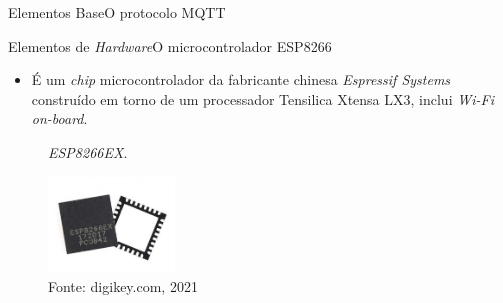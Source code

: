 \begin{frame}{Elementos Base}{O protocolo MQTT}
    \begin{table}[H]
        \centering
        \caption{Caracteres especiais utilizados para envio e recebimento no protocolo MQTT.}
        \label{tab:simbolos_mqtt}
    \end{table}

\end{frame}


\begin{frame}{Elementos de \textit{Hardware}}{O microcontrolador ESP8266}
    \begin{itemize}
        \item É um \textit{chip} microcontrolador da fabricante chinesa \textit{Espressif Systems} construído em torno de um processador Tensilica Xtensa LX3, inclui \textit{Wi-Fi on-board}.
    \end{itemize}

    \begin{figure}[H]
        \centering
        \caption{\textit{ESP8266EX}.}
        \includegraphics[width=0.3\textwidth]{figuras/esp8266ex.jpg}
        \caption*{\tiny{Fonte: digikey.com, 2021}}
        \label{fig:esp8266ex}
    \end{figure} 
\end{frame}

